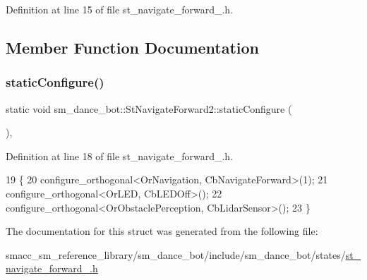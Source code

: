 Definition at line 15 of file st\+\_\+navigate\+\_\+forward\+\_.\+h.



\subsection{Member Function Documentation}
\mbox{\label{structsm__dance__bot_1_1StNavigateForward2_a58d2a866ecf79f736d9fa54784c71ea8}} 
\subsubsection{\texorpdfstring{static\+Configure()}{staticConfigure()}}
{\footnotesize\ttfamily static void sm\+\_\+dance\+\_\+bot\+::\+St\+Navigate\+Forward2\+::static\+Configure (\begin{DoxyParamCaption}{ }\end{DoxyParamCaption})\hspace{0.3cm}{\ttfamily [inline]}, {\ttfamily [static]}}



Definition at line 18 of file st\+\_\+navigate\+\_\+forward\+\_.\+h.


\begin{DoxyCode}
19   \{
20     configure\_orthogonal<OrNavigation, CbNavigateForward>(1);
21     configure\_orthogonal<OrLED, CbLEDOff>();
22     configure\_orthogonal<OrObstaclePerception, CbLidarSensor>();
23   \}
\end{DoxyCode}


The documentation for this struct was generated from the following file\+:\begin{DoxyCompactItemize}
\item 
smacc\+\_\+sm\+\_\+reference\+\_\+library/sm\+\_\+dance\+\_\+bot/include/sm\+\_\+dance\+\_\+bot/states/\hyperlink{sm__dance__bot_2include_2sm__dance__bot_2states_2st__navigate__forward__2_8h}{st\+\_\+navigate\+\_\+forward\+\_.\+h}\end{DoxyCompactItemize}
